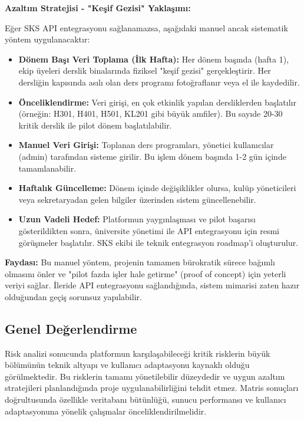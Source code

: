 \documentclass[a4paper,12pt]{report}
\begin{document}
\textbf{Azaltım Stratejisi - "Keşif Gezisi" Yaklaşımı:}

Eğer SKS API entegrasyonu sağlanamazsa, aşağıdaki manuel ancak sistematik yöntem uygulanacaktır:

\begin{itemize}
    \item \textbf{Dönem Başı Veri Toplama (İlk Hafta):} Her dönem başında (hafta 1), ekip üyeleri derslik binalarında fiziksel "keşif gezisi" gerçekleştirir. Her dersliğin kapısında asılı olan ders programı fotoğraflanır veya el ile kaydedilir.

    \item \textbf{Önceliklendirme:} Veri girişi, en çok etkinlik yapılan dersliklerden başlatılır (örneğin: H301, H401, H501, KL201 gibi büyük amfiler). Bu sayıde 20-30 kritik derslik ile pilot dönem başlatılabilir.

    \item \textbf{Manuel Veri Girişi:} Toplanan ders programları, yönetici kullanıcılar (admin) tarafından sisteme girilir. Bu işlem dönem başında 1-2 gün içinde tamamlanabilir.

    \item \textbf{Haftalık Güncelleme:} Dönem içinde değişiklikler olursa, kulüp yöneticileri veya sekretaryadan gelen bilgiler üzerinden sistem güncellenebilir.

    \item \textbf{Uzun Vadeli Hedef:} Platformun yaygınlaşması ve pilot başarısı gösterildikten sonra, üniversite yönetimi ile API entegrasyonu için resmi görüşmeler başlatılır. SKS ekibi ile teknik entegrasyon roadmap'i oluşturulur.
\end{itemize}

\textbf{Faydası:} Bu manuel yöntem, projenin tamamen bürokratik sürece bağımlı olmasını önler ve "pilot fazda işler hale getirme" (proof of concept) için yeterli veriyi sağlar. İleride API entegrasyonu sağlandığında, sistem mimarisi zaten hazır olduğundan geçiş sorunsuz yapılabilir.

\subsection{Genel Değerlendirme}

Risk analizi sonucunda platformun karşılaşabileceği kritik risklerin büyük bölümünün teknik altyapı ve kullanıcı adaptasyonu kaynaklı olduğu görülmektedir. Bu risklerin tamamı yönetilebilir düzeydedir ve uygun azaltım stratejileri planlandığında proje uygulanabilirliğini tehdit etmez. Matris sonuçları doğrultusunda özellikle veritabanı bütünlüğü, sunucu performansı ve kullanıcı adaptasyonuna yönelik çalışmalar önceliklendirilmelidir.
\end{document}
